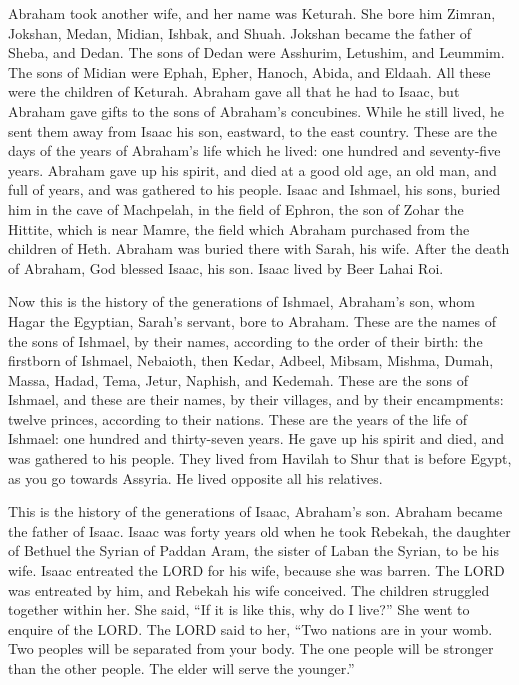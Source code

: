  Abraham took another wife, and her name was Keturah.
 She bore him Zimran, Jokshan, Medan, Midian, Ishbak, and
Shuah.  Jokshan became the father of Sheba, and Dedan. The
sons of Dedan were Asshurim, Letushim, and Leummim.  The
sons of Midian were Ephah, Epher, Hanoch, Abida, and Eldaah. All these
were the children of Keturah.  Abraham gave all that he had
to Isaac,  but Abraham gave gifts to the sons of Abraham's
concubines. While he still lived, he sent them away from Isaac his son,
eastward, to the east country.  These are the days of the
years of Abraham's life which he lived: one hundred and seventy-five
years.  Abraham gave up his spirit, and died at a good old
age, an old man, and full of years, and was gathered to his people.
 Isaac and Ishmael, his sons, buried him in the cave of
Machpelah, in the field of Ephron, the son of Zohar the Hittite, which
is near Mamre,  the field which Abraham purchased from the
children of Heth. Abraham was buried there with Sarah, his wife.
 After the death of Abraham, God blessed Isaac, his son.
Isaac lived by Beer Lahai Roi.

 Now this is the history of the generations of Ishmael,
Abraham's son, whom Hagar the Egyptian, Sarah's servant, bore to
Abraham.  These are the names of the sons of Ishmael, by
their names, according to the order of their birth: the firstborn of
Ishmael, Nebaioth, then Kedar, Adbeel, Mibsam,  Mishma,
Dumah, Massa,  Hadad, Tema, Jetur, Naphish, and Kedemah.
 These are the sons of Ishmael, and these are their names,
by their villages, and by their encampments: twelve princes, according
to their nations.  These are the years of the life of
Ishmael: one hundred and thirty-seven years. He gave up his spirit and
died, and was gathered to his people.  They lived from
Havilah to Shur that is before Egypt, as you go towards Assyria. He
lived opposite all his relatives.

 This is the history of the generations of Isaac, Abraham's
son. Abraham became the father of Isaac.  Isaac was forty
years old when he took Rebekah, the daughter of Bethuel the Syrian of
Paddan Aram, the sister of Laban the Syrian, to be his wife.
 Isaac entreated the LORD for his wife, because she was
barren. The LORD was entreated by him, and Rebekah his wife conceived.
 The children struggled together within her. She said, ``If
it is like this, why do I live?'' She went to enquire of the LORD.
 The LORD said to her, ``Two nations are in your womb. Two
peoples will be separated from your body. The one people will be
stronger than the other people. The elder will serve the younger.''

